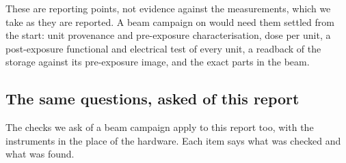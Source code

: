 These are reporting points, not evidence against the measurements, which
we take as they are reported. A beam campaign on \bfs would need them
settled from the start: unit provenance and pre-exposure
characterisation, dose per unit, a post-exposure functional and
electrical test of every unit, a readback of the storage against its
pre-exposure image, and the exact parts in the beam.

\subsection{The same questions, asked of this report}\label{sec:selfaudit}

The checks we ask of a beam campaign apply to this report too, with the
instruments in the place of the hardware. Each item says what was
checked and what was found.

